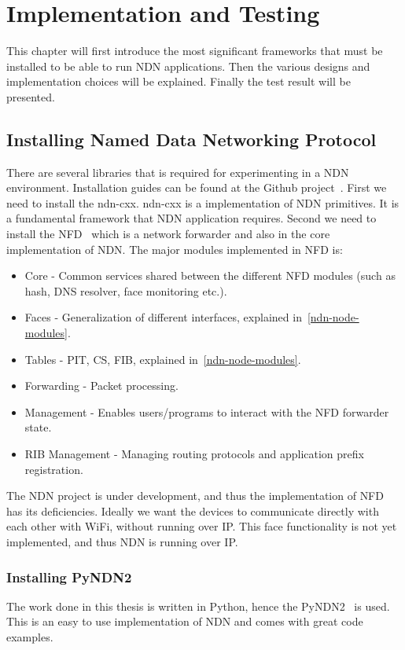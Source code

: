 \chapter{Implementation and Testing}
This chapter will first introduce the most significant frameworks that must be installed to be able to run \gls{NDN} applications.
Then the various designs and implementation choices will be explained. 
Finally the test result will be presented.

\section{Installing Named Data Networking Protocol}

There are several libraries that is required for experimenting in a \gls{NDN} environment.
Installation guides can be found at the Github project~\cite{ndn-git}.
First we need to install the \gls{ndn-cxx}.
\gls{ndn-cxx} is a implementation of \gls{NDN} primitives. 
It is a fundamental framework that \gls{NDN} application requires. 
Second we need to install the \gls{NFD}~\cite{nfd} which is a network forwarder and also in the core implementation of \gls{NDN}.
The major modules implemented in \gls{NFD} is:
\begin{itemize}
  \item Core - Common services shared between the different \gls{NFD} modules (such as hash, \gls{DNS} resolver, face monitoring etc.).
  \item Faces - Generalization of different interfaces, explained in~\autoref{ndn-node-modules}.
  \item Tables - \gls{PIT}, \gls{CS}, \gls{FIB}, explained in~\autoref{ndn-node-modules}.
  \item Forwarding - Packet processing.
  \item Management - Enables users/programs to interact with the \gls{NFD} forwarder state.
  \item\gls{RIB} Management - Managing routing protocols and application prefix registration.
\end{itemize}
The \gls{NDN} project is under development, and thus the implementation of \gls{NFD} has its deficiencies.
Ideally we want the devices to communicate directly with each other with WiFi, without running over \gls{IP}. 
This face functionality is not yet implemented, and thus \gls{NDN} is running over \gls{IP}.

\subsection{Installing PyNDN2}
The work done in this thesis is written in Python, hence the \gls{PyNDN2}~\cite{pyndn2-git} is used.
This is an easy to use implementation of \gls{NDN} and comes with great code examples.

